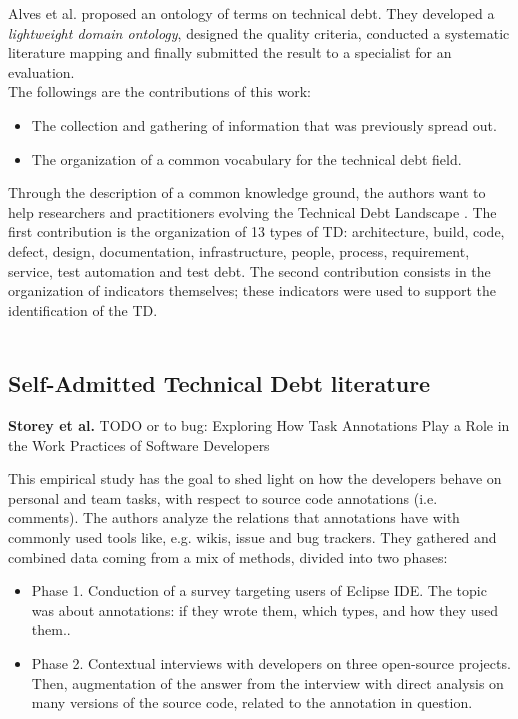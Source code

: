 Alves et al. proposed an ontology of terms on technical debt. They developed a \emph{lightweight domain ontology}, designed the quality criteria, conducted a systematic literature mapping and finally submitted the result to a specialist for an evaluation.
\\
The followings are the contributions of this work:
\begin{itemize}
    \item The collection and gathering of information that was previously spread out.
    \item The organization of a common vocabulary for the technical debt field. 
\end{itemize}
Through the description of a common knowledge ground, the authors want to help researchers and practitioners evolving the Technical Debt Landscape \cite{izurieta2012organizing}.
The first contribution is the organization of 13 types of TD: architecture, build, code, defect, design, documentation, infrastructure, people, process, requirement, service, test automation and test debt.
The second contribution consists in the organization of indicators themselves; these indicators were used to support the identification of the TD.
\\
\\
\subsection{Self-Admitted Technical Debt literature}
\textbf{Storey et al.} \cite{storey2008todo} TODO or to bug: Exploring How Task Annotations Play a Role in the Work Practices of Software Developers

This empirical study has the goal to shed light on how the developers behave on personal and team tasks, with respect to source code annotations (i.e. comments).
The authors analyze the relations that annotations have with commonly used tools like, e.g. wikis, issue and bug trackers. They gathered and combined data coming from a mix of methods, divided into two phases:
\begin{itemize}
    \item Phase 1. Conduction of a survey targeting users of Eclipse IDE. The topic was about annotations: if they wrote them, which types, and how they used them..
    \item Phase 2. Contextual interviews with developers on three open-source projects. Then, augmentation of the answer from the interview with direct analysis on many versions of the source code, related to the annotation in question.
\end{itemize}

